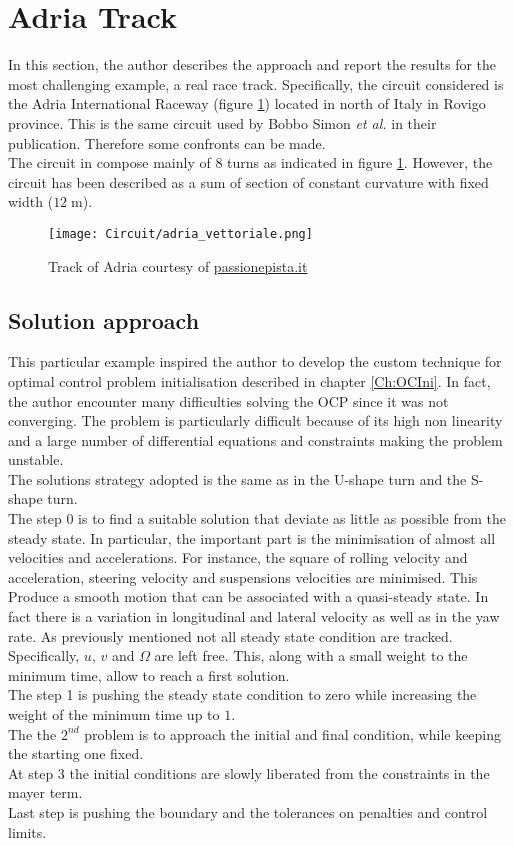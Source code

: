 \section{Adria Track}
%
In this section, the author describes the approach and report the results for the most challenging example, a real race track. Specifically, the circuit considered is the Adria International Raceway (figure \ref{fig:AdriaTrackpng}) located in north of Italy in Rovigo province. This is the same circuit used by Bobbo Simon \textit{et al.}\cite{simon2008application} in their publication. Therefore some confronts can be made.\\
The circuit in compose mainly of $8$ turns as indicated in figure \ref{fig:AdriaTrackpng}. However, the circuit has been described as a sum of section of constant curvature with fixed width ($12\;\si{\metre}$).
%
\begin{figure}[ht!]
    \centering
    \texttt{[image: Circuit/adria\_vettoriale.png]}
    \caption{Track of Adria courtesy of \href{http://www.passionepista.it/circuiti/descrizione/7-autodromo_di_adria}{passionepista.it}}
    \label{fig:AdriaTrackpng}
\end{figure}
%
\subsection{Solution approach}
%
This particular example inspired the author to develop the custom technique for optimal control problem initialisation described in chapter \ref{Ch:OCIni}. In fact, the author encounter many difficulties solving the OCP since it was not converging. The problem is particularly difficult because of its high non linearity and a large number of differential equations and constraints making the problem unstable.\\
The solutions strategy adopted is the same as in the U-shape turn and the S-shape turn. \\
The step 0 is to find a suitable solution that deviate as little as possible from the steady state. In particular, the important part is the minimisation of almost all velocities and accelerations. For instance, the square of rolling velocity and acceleration, steering velocity and suspensions velocities are minimised. This Produce a smooth motion that can be associated with a quasi-steady state. In fact there is a variation in longitudinal and lateral velocity as well as in the yaw rate.
As previously mentioned not all steady state condition are tracked. Specifically, $u$, $v$ and $\Omega$ are left free. This, along with a small weight to the minimum time, allow to reach a first solution.\\
The step 1 is pushing the steady state condition to zero while increasing the weight of the minimum time up to $1$.\\
The the $2^{nd}$ problem is to approach the initial and final condition, while keeping the starting one fixed.\\
At step 3 the initial conditions are slowly liberated from the constraints in the mayer term.\\
Last step is pushing the boundary and the tolerances on penalties and control limits.
%
